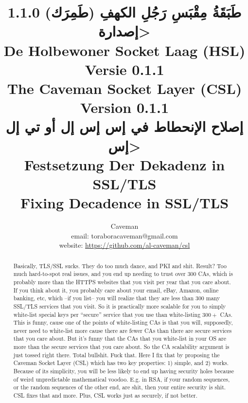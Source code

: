 \documentclass{article}
\author{Caveman\\
email: toraboracaveman@gmail.com\\
website: \url{https://github.com/al-caveman/csl}}
\title{
1.1.0 \<طَبَقَةُ مِقْبَسِ رَجُلِ الكهفِ (طَمِرَك) إصدارة>\\
De Holbewoner Socket Laag (HSL) Versie 0.1.1\\
The Caveman Socket Layer (CSL) Version 0.1.1\\
{\large \<إصلاح الإنحطاط في إس إس إل أو تي إل إس>}\\
{\large Festsetzung Der Dekadenz in SSL/TLS}\\
{\large Fixing Decadence in SSL/TLS}}
\begin{document}
 \maketitle
\begin{abstract}
    Basically, TLS/SSL sucks. They do too much dance, and PKI and shit. Result?
    Too much hard-to-spot real issues, and you end up needing to trust over
    $300$ CAs, which is probably more than the HTTPS websites that you visit
    per year that you care about. If you think about it, you probably care
    about your email, eBay, Amazon, online banking, etc, which --if you list--
    you will realize that they are less than $300$ many SSL/TLS services that
    you visit. So it is practically more scalable for you to simply white-list
    special keys per ``secure'' service that you use than white-listing $300+$
    CAs. This is funny, cause one of the points of white-listing CAs is that
    you will, supposedly, never need to white-list more cause there are fewer
    CAs than there are secure services that you care about. But it's funny that
    the CAs that you white-list in your OS are more than the secure services
    that you care about. So the CA scalability argument is just tossed right
    there. Total bullshit. Fuck that. Here I fix that by proposing the Caveman
    Socket Layer (CSL) which has two key properties: 1) simple, and 2) works.
    Because of its simplicity, you will be less likely to end up having
    security holes because of weird unpredictable mathematical voodoo. E.g. in
    RSA, if your random sequences, or the random sequences of the other end,
    are shit, then your entire security is shit.  CSL fixes that and more.
    Plus, CSL works just as securely, if not better.
\end{abstract}
\end{document}
